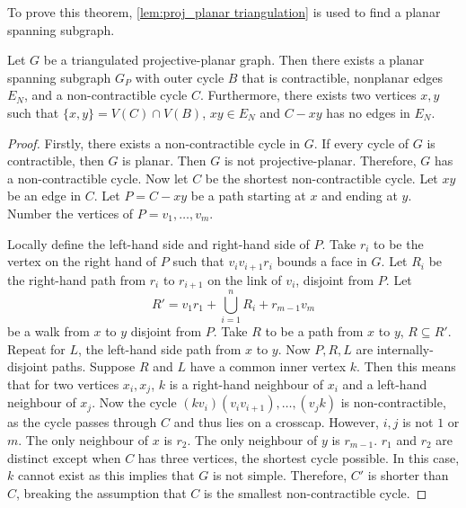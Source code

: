 To prove this theorem, \cref{lem:proj_planar triangulation} is used to find a planar spanning subgraph.

\begin{lemma}\label{lem:proj_planar triangulation}
    Let $G$ be a triangulated projective-planar graph. Then there exists a planar spanning subgraph $G_P$ with outer cycle $B$ that is contractible, nonplanar edges $E_N$, and a non-contractible cycle $C$. Furthermore, there exists two vertices $x, y$ such that $\{x, y \} = V(C) \cap V(B)$, $xy \in E_N$ and $C - xy$ has no edges in $E_N$. 
\end{lemma}

\begin{proof}
     Firstly, there exists a non-contractible cycle in $G$. If every cycle of $G$ is contractible, then $G$ is planar. Then $G$ is not projective-planar. Therefore, $G$ has a non-contractible cycle. Now let $C$ be the shortest non-contractible cycle. Let $xy$ be an edge in $C$. Let $P = C - xy$ be a path starting at $x$ and ending at $y$. 
    Number the vertices of $P = v_1, \ldots, v_m$. 

    Locally define the left-hand side and right-hand side of $P$. Take $r_i$ to be the vertex on the right hand of $P$ such that $v_i v_{i + 1} r_i$ bounds a face in $G$. Let $R_i$ be the right-hand path from $r_i$ to $r_{i + 1}$ on the link of $v_i$, disjoint from $P$. Let 
    \begin{equation*}
        R' = v_1 r_1 + \bigcup_{i = 1}^n R_i + r_{m-1} v_m
    \end{equation*}
    be a walk from $x$ to $y$ disjoint from $P$. Take $R$ to be a path from $x$ to $y$, $R \subseteq R'$. Repeat for $L$, the left-hand side path from $x$ to $y$. Now $P, R, L$ are internally-disjoint paths. Suppose $R$ and $L$ have a common inner vertex $k$. Then this means that for two vertices $x_i, x_j$, $k$ is a right-hand neighbour of $x_i$ and a left-hand neighbour of $x_j$. Now the cycle $(k v_i) (v_i v_{i + 1}), \ldots , (v_j k)$ is non-contractible, as the cycle passes through $C$ and thus lies on a crosscap. However, $i, j$ is not $1$ or $m$. The only neighbour of $x$ is $r_2$. The only neighbour of $y$ is $r_{m-1}$. $r_1$ and $r_2$ are distinct except when $C$ has three vertices, the shortest cycle possible. In this case, $k$ cannot exist as this implies that $G$ is not simple. Therefore, $C'$ is shorter than $C$, breaking the assumption that $C$ is the smallest non-contractible cycle.


\end{proof}
